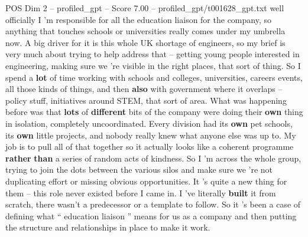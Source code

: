 \begin{textsample}{POS Dim 2 – profiled\_gpt – Score 7.00 – profiled\_gpt/t001628\_gpt.txt}  \label{ex:f2_pos_006}
well officially I ’m responsible for all the education liaison for the company, so anything that touches schools or universities really comes under my umbrella now.
A big driver for it is this whole UK shortage of engineers, so my brief is very much about trying to help address that – getting young people interested in engineering, making sure we ’re visible in the right places, that sort of thing.
So I spend a \textbf{lot} of time working with schools and colleges, universities, careers events, all those kinds of things, and then \textbf{also} with government where it overlaps – policy stuff, initiatives around STEM, that sort of area.
What was happening before was that \textbf{lots} of \textbf{different} bits of the company were doing their \textbf{own} thing in isolation, completely uncoordinated.
Every division had its \textbf{own} pet schools, its \textbf{own} little projects, and nobody really knew what anyone else was up to.
My job is to pull all of that together so it actually looks like a coherent programme \textbf{rather} \textbf{than} a series of random acts of kindness.
So I ’m across the whole group, trying to join the dots between the various silos and make sure we ’re not duplicating effort or missing obvious opportunities.
It ’s quite a new thing for them – this role never existed before I came in.
I ’ve literally \textbf{built} it from scratch, there wasn't a predecessor or a template to follow.
So it ’s been a case of defining what “ education liaison ” means for us as a company and then putting the structure and relationships in place to make it work.

\end{textsample}
